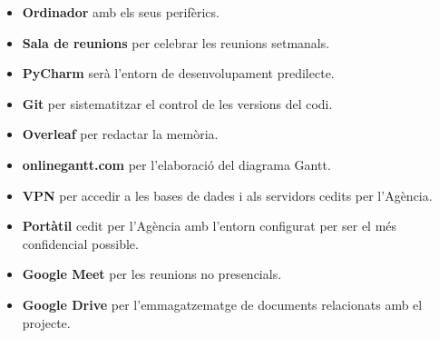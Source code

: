 \begin{itemize}
    \item \textbf{Ordinador} amb els seus perifèrics.
    \item \textbf{Sala de reunions} per celebrar les reunions setmanals.
    \item \textbf{PyCharm} serà l'entorn de desenvolupament predilecte.
    \item \textbf{Git} per sistematitzar el control de les versions del codi.
    \item \textbf{Overleaf} per redactar la memòria.
    \item \textbf{onlinegantt.com} per l'elaboració del diagrama Gantt.
    \item \textbf{VPN} per accedir a les bases de dades i als servidors cedits per l'Agència.
    \item \textbf{Portàtil} cedit per l'Agència amb l'entorn configurat per ser el més confidencial possible.
    \item \textbf{Google Meet} per les reunions no presencials.
    \item \textbf{Google Drive} per l'emmagatzematge de documents relacionats amb el projecte.
\end{itemize}
